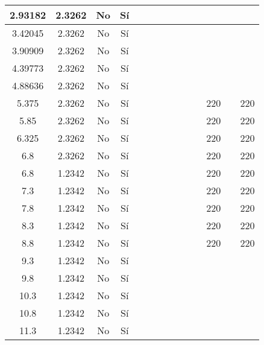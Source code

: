 \begin{table}[H]
{\begin{tabular}{|c|c|c|c|c|c|c|c|c|c|c|c|c|c|}
\hline
2.93182 & 2.3262 & No  & Sí  &     &     &     &     &     &     &     &     &     &  \bigstrut\\
\hline
3.42045 & 2.3262 & No  & Sí  &     &     &     &     &     &     &     &     &     &  \bigstrut\\
\hline
3.90909 & 2.3262 & No  & Sí  &     &     &     &     &     &     &     &     &     &  \bigstrut\\
\hline
4.39773 & 2.3262 & No  & Sí  &     &     &     &     &     &     &     &     &     &  \bigstrut\\
\hline
4.88636 & 2.3262 & No  & Sí  &     &     &     &     &     &     &     &     &     &  \bigstrut\\
\hline
5.375 & 2.3262 & No  & Sí  &     &     &     &     &     &     &     & 220 &     & 220 \bigstrut\\
\hline
5.85 & 2.3262 & No  & Sí  &     &     &     &     &     &     &     & 220 &     & 220 \bigstrut\\
\hline
6.325 & 2.3262 & No  & Sí  &     &     &     &     &     &     &     & 220 &     & 220 \bigstrut\\
\hline
6.8 & 2.3262 & No  & Sí  &     &     &     &     &     &     &     & 220 &     & 220 \bigstrut\\
\hline
6.8 & 1.2342 & No  & Sí  &     &     &     &     &     &     &     & 220 &     & 220 \bigstrut\\
\hline
7.3 & 1.2342 & No  & Sí  &     &     &     &     &     &     &     & 220 &     & 220 \bigstrut\\
\hline
7.8 & 1.2342 & No  & Sí  &     &     &     &     &     &     &     & 220 &     & 220 \bigstrut\\
\hline
8.3 & 1.2342 & No  & Sí  &     &     &     &     &     &     &     & 220 &     & 220 \bigstrut\\
\hline
8.8 & 1.2342 & No  & Sí  &     &     &     &     &     &     &     & 220 &     & 220 \bigstrut\\
\hline
9.3 & 1.2342 & No  & Sí  &     &     &     &     &     &     &     &     &     &  \bigstrut\\
\hline
9.8 & 1.2342 & No  & Sí  &     &     &     &     &     &     &     &     &     &  \bigstrut\\
\hline
10.3 & 1.2342 & No  & Sí  &     &     &     &     &     &     &     &     &     &  \bigstrut\\
\hline
10.8 & 1.2342 & No  & Sí  &     &     &     &     &     &     &     &     &     &  \bigstrut\\
\hline
11.3 & 1.2342 & No  & Sí  &     &     &     &     &     &     &     &     &     &  \bigstrut\\

\end{tabular}}
\end{table}
